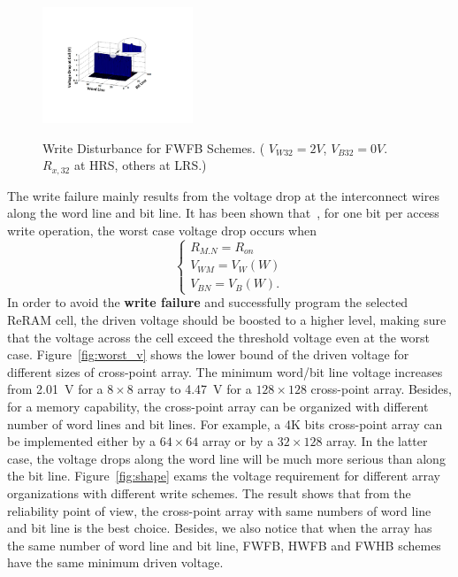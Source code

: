 \begin{figure}%
\centering
  \includegraphics[width=0.4\textwidth]{./figures/FWFB4.pdf}\\
  \caption{Write Disturbance for FWFB Schemes. ( $V_{W32} = 2V$, $V_{B32} = 0V$. $R_{x,32}$ at HRS, others at LRS.) }\label{fig:FWFR}
\end{figure}

The write failure mainly results from the voltage drop at the interconnect wires along the word line and bit line. It has been shown that~\cite{crossbar_TED_2010}, for one bit per access write operation, the worst case voltage drop occurs when
\begin{equation}
\left\{
\begin{array}{l}
R_{M.N}=R_{on}\\
V_{WM}=V_W(W)\\
V_{BN}=V_B(W).
\end{array} \right.
\end{equation}
In order to avoid the \textbf{write failure} and successfully program the
selected ReRAM cell, the driven voltage should be boosted to a higher
level, making sure that the voltage across the cell exceed the threshold
voltage even at the worst case. Figure~\ref{fig:worst_v} shows the lower bound of the driven voltage for different sizes of cross-point array. The minimum word/bit line voltage increases from 2.01~V for a $8 \times 8$ array to 4.47~V for a $128 \times 128$ cross-point array. Besides, for a  memory capability, the cross-point array can be organized with different number of word lines and bit lines. For example, a 4K bits cross-point array can be implemented either by a $64 \times 64$ array or by a $32 \times 128$ array. In the latter case, the voltage drops along the word line will be much more serious than along the bit line. Figure~\ref{fig:shape}
exams the voltage requirement for different array organizations with different write schemes. The result shows that from the reliability point of view, the cross-point array with same numbers of word line and bit line is the best choice. Besides, we also notice that when the array has the same number of word line and bit line, FWFB, HWFB and FWHB schemes have the same minimum driven voltage.

